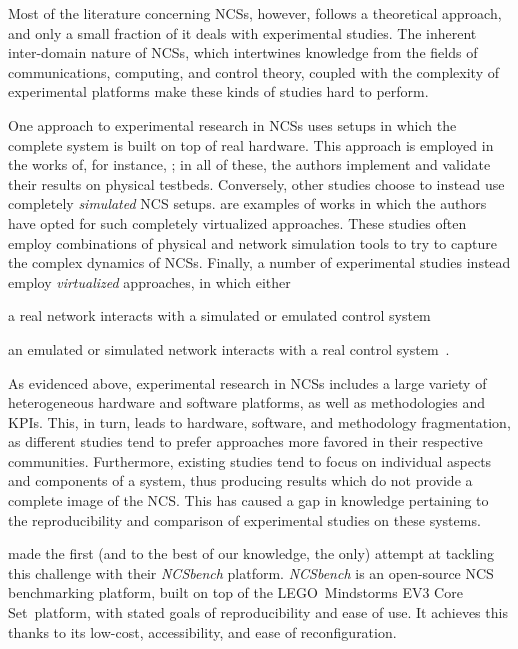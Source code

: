 Most of the literature concerning \acp{NCS}, however, follows a theoretical approach, and only a small fraction of it deals with experimental studies.
The inherent inter-domain nature of \acp{NCS}, which intertwines knowledge from the fields of communications, computing, and control theory, coupled with the complexity of experimental platforms make these kinds of studies hard to perform.

One approach to experimental research in \acp{NCS} uses setups in which the complete system is built on top of real hardware.
This approach is employed in the works of, for instance, \textcite{Li2014Wireless,Baumann2018LowPower,Cuenca2019UAV}; in all of these, the authors implement and validate their results on physical testbeds.
Conversely, other studies choose to instead use completely \emph{simulated} \ac{NCS} setups.
\textcite{Wu2012NPC,Chen2015synccontrol,Ma2019DynamicSched} are examples of works in which the authors have opted for such completely virtualized approaches.
These studies often employ combinations of physical and network simulation tools to try to capture the complex dynamics of \acp{NCS}.
Finally, a number of experimental studies instead employ \emph{virtualized} approaches, in which either
\begin{enumerate*}[itemjoin={{; }}, itemjoin*={{; or }}]
    \item a real network interacts with a simulated or emulated control system~\cite{Wang2020VoltageControl}
    \item an emulated or simulated network interacts with a real control system~\cite{Natale2004InvPendEthernet}.
\end{enumerate*}

As evidenced above, experimental research in \acp{NCS} includes a large variety of heterogeneous hardware and software platforms, as well as methodologies and \aclp*{KPI}.
This, in turn, leads to hardware, software, and methodology fragmentation, as different studies tend to prefer approaches more favored in their respective communities.
Furthermore, existing studies tend to focus on individual aspects and components of a system, thus producing results which do not provide a complete image of the \ac{NCS}.
This has caused a gap in knowledge pertaining to the reproducibility and comparison of experimental studies on these systems.

\textcite{Zoppi2020NCSBench} made the first (and to the best of our knowledge, the only) attempt at tackling this challenge with their \emph{NCSbench} platform.
\emph{NCSbench} is an open-source \ac{NCS} benchmarking platform, built on top of the LEGO\textregistered{}\ Mindstorms EV3 Core Set\texttrademark{}\ platform, with stated goals of reproducibility and ease of use.
It achieves this thanks to its low-cost, accessibility, and ease of reconfiguration.

